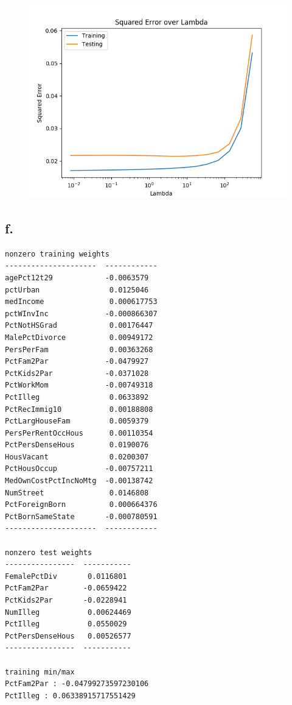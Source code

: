 \documentclass{article}
\newcommand{\1}{\mathbf{1}}
\begin{document}
{\begin{figure}[ht!]
  \centering
  \includegraphics[width=120mm]{../hw2-code/results/a5_e.png}
\end{figure}

\subsection*{f.}

\begin{verbatim}
nonzero training weights
---------------------  ------------
agePct12t29            -0.0063579
pctUrban                0.0125046
medIncome               0.000617753
pctWInvInc             -0.000866307
PctNotHSGrad            0.00176447
MalePctDivorce          0.00949172
PersPerFam              0.00363268
PctFam2Par             -0.0479927
PctKids2Par            -0.0371028
PctWorkMom             -0.00749318
PctIlleg                0.0633892
PctRecImmig10           0.00188808
PctLargHouseFam         0.0059379
PersPerRentOccHous      0.00110354
PctPersDenseHous        0.0190076
HousVacant              0.0200307
PctHousOccup           -0.00757211
MedOwnCostPctIncNoMtg  -0.00138742
NumStreet               0.0146808
PctForeignBorn          0.000664376
PctBornSameState       -0.000780591
---------------------  ------------

nonzero test weights
----------------  -----------
FemalePctDiv       0.0116801
PctFam2Par        -0.0659422
PctKids2Par       -0.0228941
NumIlleg           0.00624469
PctIlleg           0.0550029
PctPersDenseHous   0.00526577
----------------  -----------

training min/max
PctFam2Par : -0.04799273597230106
PctIlleg : 0.06338915717551429


\end{verbatim}}
\end{document}
